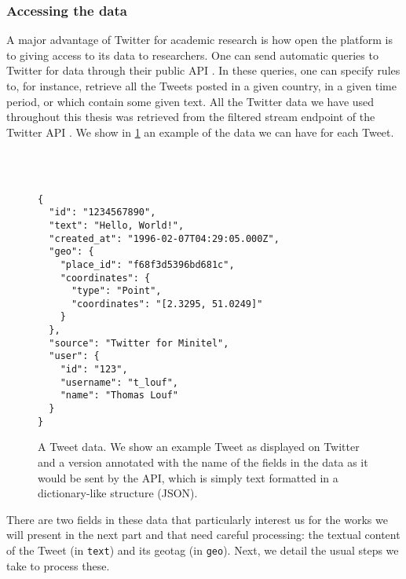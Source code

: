 \documentclass[../thesis.tex]{subfiles}
\begin{document}
\subsubsection{Accessing the data}
A major advantage of Twitter for academic research is how open the platform is to giving
access to its data to researchers. One can send automatic queries to Twitter for data
through their public \ac{API} \cite{TwitterAPI}. In these queries, one can specify rules
to, for instance, retrieve all the Tweets posted in a given country, in a given time
period, or which contain some given text. All the Twitter data we have used throughout
this thesis was retrieved from the filtered stream endpoint of the Twitter \ac{API}
\cite{TwitterAPIa}. We show in \cref{fig:tweet_data} an example of the data we can have
for each Tweet.

\captionsetup[subfigure]{position=top, labelfont=it,textfont=normalfont,singlelinecheck=off,justification=raggedright}
\begin{figure}
  \centering
  \\
  \\
  \begin{SubFloat}{\label{subfig:json}}
    \begin{minipage}[b]{0.95\linewidth}
        \begin{lstlisting}[frame=single,xleftmargin=5mm]
{
  "id": "1234567890",
  "text": "Hello, World!",
  "created_at": "1996-02-07T04:29:05.000Z",
  "geo": {
    "place_id": "f68f3d5396bd681c",
    "coordinates": {
      "type": "Point",
      "coordinates": "[2.3295, 51.0249]"
    }
  },
  "source": "Twitter for Minitel",
  "user": {
    "id": "123",
    "username": "t_louf",
    "name": "Thomas Louf"
  }
}
      \end{lstlisting}
    \end{minipage}
  \end{SubFloat}
  \caption[]{A Tweet data. We show  an example Tweet as displayed
  on Twitter and  a version annotated with the name of the
  fields in  the data as it would be sent by the \ac{API}, which is
  simply text formatted in a dictionary-like structure (JSON).}
  \label{fig:tweet_data}
\end{figure}

There are two fields in these data that particularly interest us for the works we will
present in the next part and that need careful processing: the textual content of the
Tweet (in \texttt{text}) and its geotag (in \texttt{geo}). Next, we detail the usual
steps we take to process these. 
\end{document}
